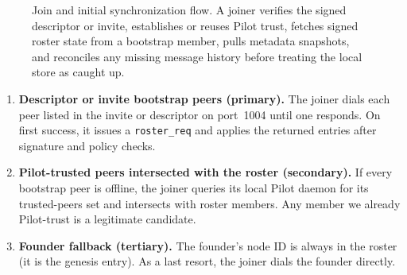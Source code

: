 \documentclass[11pt,a4paper,twocolumn]{article}
\begin{document}
\begin{figure}[t]
\centering
{}
\caption{Join and initial synchronization flow. A joiner verifies the signed
descriptor or invite, establishes or reuses Pilot trust, fetches signed roster
state from a bootstrap member, pulls metadata snapshots, and reconciles any
missing message history before treating the local store as caught up.}
\label{fig:joinflow}
\end{figure}

\begin{enumerate}
    \item \textbf{Descriptor or invite bootstrap peers (primary).} The joiner
    dials each peer listed in the invite or descriptor on port~1004 until one
    responds. On first success, it issues a \texttt{roster\_req} and applies
    the returned entries after signature and policy checks.
    \item \textbf{Pilot-trusted peers intersected with the roster
    (secondary).} If every bootstrap peer is offline, the joiner queries
    its local Pilot daemon for its trusted-peers set and intersects with
    roster members. Any member we already Pilot-trust is a legitimate
    candidate.
    \item \textbf{Founder fallback (tertiary).} The founder's node ID
    is always in the roster (it is the genesis entry). As a last
    resort, the joiner dials the founder directly.
\end{enumerate}
\end{document}
